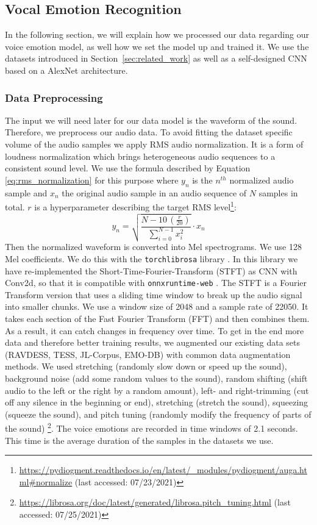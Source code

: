 \subsection{Vocal Emotion Recognition}
\label{subsec:method_vocal_emotion_recognition}
In the following section, we will explain how we processed our data regarding our voice emotion model, as well how we set the model up and trained it. We use the datasets introduced in Section~\ref{sec:related_work} as well as a self-designed CNN based on a AlexNet architecture.

\subsubsection{Data Preprocessing}
\label{subsubsec:method_vocal_emotion_recognition_data_preprocessing}
The input we will need later for our data model is the waveform of the sound. Therefore, we preprocess our audio data. To avoid fitting the dataset specific volume of the audio samples we apply RMS audio normalization. It is a form of loudness normalization which brings heterogeneous audio sequences to a consistent sound level. We use the formula described by Equation \ref{eq:rms_normalization} for this purpose where $y_n$ is the $n^{th}$ normalized audio sample and $x_n$ the original audio sample in an audio sequence of $N$ samples in total. $r$ is a hyperparameter describing the target RMS level\footnote{\url{https://pydiogment.readthedocs.io/en/latest/_modules/pydiogment/auga.html#normalize} (last accessed: 07/23/2021)}:
\begin{equation}
\label{eq:rms_normalization}
y_n=\sqrt{\frac{N-10\,(\frac{r}{20})}{\sum_{i=0}^{N-1}{x_i^2}}}\cdot{}x_n
\end{equation}
Then the normalized waveform is converted into Mel spectrograms. We use 128 Mel coefficients. We do this with the \texttt{torchlibrosa} library \cite{kong_panns_2020}. In this library we have re-implemented the Short-Time-Fourier-Transform (STFT) as CNN with Conv2d, so that it is compatible with \texttt{onnxruntime-web} \cite{onnx_runtime_developers_onnx_2021}. The STFT is a Fourier Transform version that uses a sliding time window to break up the audio signal into smaller chunks. We use a window size of 2048 and a sample rate of 22050. It takes each section of the Fast Fourier Transform (FFT) and then combines them. As a result, it can catch changes in frequency over time. To get in the end more data and therefore better training results, we augmented our existing data sets (RAVDESS, TESS, JL-Corpus, EMO-DB) with common data augmentation methods. We used stretching (randomly slow down or speed up the sound), background noise (add some random values to the sound), random shifting (shift audio to the left or the right by a random amount), left- and right-trimming (cut off any silence in the beginning or end), stretching (stretch the sound), squeezing (squeeze the sound), and pitch tuning (randomly modify the frequency of parts of the sound) \footnote{\url{ https://librosa.org/doc/latest/generated/librosa.pitch_tuning.html} (last accessed: 07/25/2021)}. The voice emotions are recorded in time windows of 2.1 seconds. This time is the average duration of the samples in the datasets we use.

